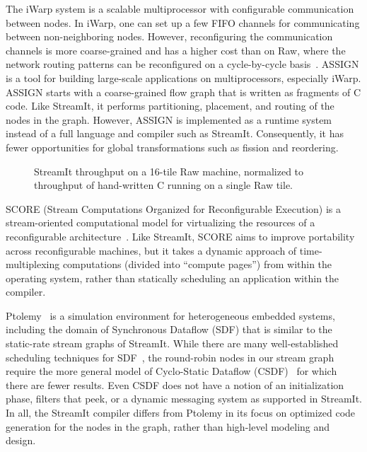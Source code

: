 The iWarp system \cite{iwarp} is a scalable multiprocessor with
configurable communication between nodes.  In iWarp, one can set up a
few FIFO channels for communicating between non-neighboring
nodes. However, reconfiguring the communication channels is more
coarse-grained and has a higher cost than on Raw, where the network
routing patterns can be reconfigured on a cycle-by-cycle
basis~\cite{scalaroperands}.  ASSIGN \cite{assign} is a tool for
building large-scale applications on multiprocessors, especially
iWarp.  ASSIGN starts with a coarse-grained flow graph that is written
as fragments of C code.  Like StreamIt, it performs partitioning,
placement, and routing of the nodes in the graph.  However, ASSIGN is
implemented as a runtime system instead of a full language and
compiler such as StreamIt.  Consequently, it has fewer opportunities
for global transformations such as fission and reordering.

\begin{figure}
\centering
\vspace{6pt}
\vspace{-6pt}
\caption{\protect\small StreamIt throughput on a 16-tile Raw machine,
normalized to throughput of hand-written C running on a single Raw
tile.  \protect\label{fig:opt-diagram}}
\vspace{-12pt}
\end{figure}

SCORE (Stream Computations Organized for Reconfigurable Execution) is
a stream-oriented computational model for virtualizing the resources
of a reconfigurable architecture~\cite{score}.  Like StreamIt, SCORE
aims to improve portability across reconfigurable machines, but it
takes a dynamic approach of time-multiplexing computations (divided
into ``compute pages'') from within the operating system, rather than
statically scheduling an application within the compiler.

Ptolemy~\cite{ptolemyoverview} is a simulation environment for
heterogeneous embedded systems, including the domain of Synchronous
Dataflow (SDF) that is similar to the static-rate stream graphs of
StreamIt.  While there are many well-established scheduling techniques
for SDF~\cite{leesdf}, the round-robin nodes in our stream graph
require the more general model of Cyclo-Static Dataflow
(CSDF)~\cite{BELP96} for which there are fewer results.  Even CSDF
does not have a notion of an initialization phase, filters that peek,
or a dynamic messaging system as supported in StreamIt.  In all, the
StreamIt compiler differs from Ptolemy in its focus on optimized code
generation for the nodes in the graph, rather than high-level modeling
and design.

